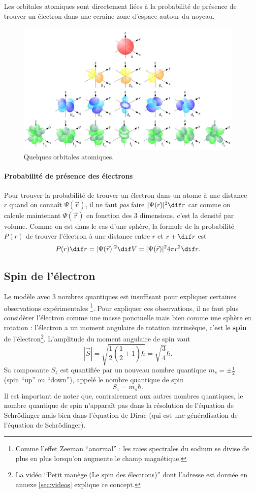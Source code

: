 Les orbitales atomiques sont directement liées
à la probabilité de présence de trouver un électron
dans une ceraine zone d'espace autour du noyeau.

\begin{figure}[ht]
	\centering
	\includegraphics[scale=0.7]{img/orbitales.jpg}
	\caption{Quelques orbitales atomiques.}
	\label{fig:orbitales}
\end{figure}

\paragraph{Probabilité de présence des électrons}
Pour trouver la probabilité de trouver un électron dans un atome
à une distance $r$ quand on connaît $\Psi(\vec{r})$,
il ne faut \emph{pas} faire $|\Psi(\vec{r})|^2 \dif r$
car comme on calcule maintenant $\Psi(\vec{r})$ en fonction des 3 dimensions,
c'est la densité par volume.
Comme on est dans le cas d'une sphère, la formule de la probabilité
$P(r)$ de trouver l'électron à une distance entre $r$ et $r+\dif r$ est
\[ P(r) \dif r = |\Psi(\vec{r})|^2 \dif V
= |\Psi(\vec{r})|^2 4\pi r^2 \dif r. \]

\subsection{Spin de l'électron}
Le modèle avec 3 nombres quantiques est insuffisant
pour expliquer certaines observations expérimentales
\footnote{Comme l'effet Zeeman ``anormal'' : les
raies spectrales du sodium se divise de plus en plus
lorsqu'on augmente le champ magnétique.}. Pour expliquer 
ces observations, il ne faut plus considèrer l'électron
comme une masse ponctuelle
mais bien comme une sphère en rotation : l'électron
a un moment angulaire de rotation intrinsèque, c'est
le \textbf{spin} de l'électron\footnote{La vidéo ``Petit
manège (Le spin des électrons)'' dont l'adresse est donnée
en annexe \ref{sec:videos} explique ce concept.}.
L'amplitude du moment angulaire de spin vaut
\[ |\vec{S}| = \sqrt{\frac{1}{2}(\frac{1}{2}+1)\hbar} 
= \sqrt{\frac{3}{4}}\hbar.\]
Sa composante $S_z$ est quantifiée par un nouveau
nombre quantique $m_s = \pm\frac{1}{2}$ (spin ``up''
ou ``down''), appelé le nombre quantique de spin
\[ S_z = m_s\hbar. \] 
Il est important de noter que, contrairement aux
autres nombres quantiques, le nombre quantique
de spin n'apparaît pas dans la résolution
de l'équation de Schrödinger mais bien
dans l'équation de Dirac (qui est une généralisation
de l'équation de Schrödinger).

